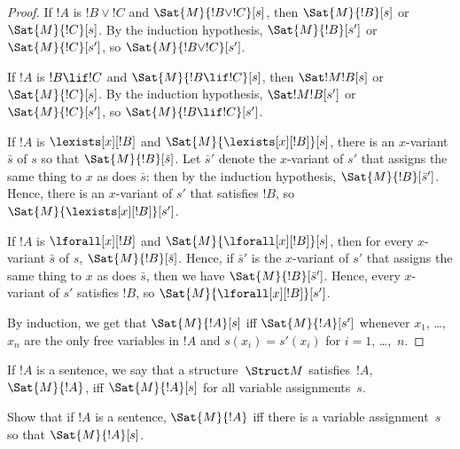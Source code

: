 \documentclass[../../include/open-logic-section]{subfiles}
\begin{document}
\begin{proof}
If $!A$ is $!B \lor !C$ and $\Sat{M}{!B \lor !C}[s]$, then
$\Sat{M}{!B}[s]$ or $\Sat{M}{!C}[s]$. By the induction hypothesis,
$\Sat{M}{!B}[s']$ or $\Sat{M}{!C}[s']$, so $\Sat{M}{!B \lor !C}[s']$.

If $!A$ is $!B \lif !C$ and $\Sat{M}{!B \lif !C}[s]$, then
$\Sat!{M}{!B}[s]$ or $\Sat{M}{!C}[s]$. By the induction hypothesis,
$\Sat!{M}{!B}[s']$ or $\Sat{M}{!C}[s']$, so $\Sat{M}{!B \lif !C}[s']$.

If $!A$ is $\lexists[x][!B]$ and $\Sat{M}{\lexists[x][!B]}[s]$, there
is an $x$-variant $\bar{s}$ of $s$ so that $\Sat{M}{!B}[\bar{s}]$. Let
$\bar{s}'$ denote the $x$-variant of $s'$ that assigns the same thing
to $x$ as does $\bar{s}$: then by the induction hypothesis,
$\Sat{M}{!B}[\bar{s}']$. Hence, there is an $x$-variant of $s'$ that
satisfies $!B$, so $\Sat{M}{\lexists[x][!B]}[s']$.

If $!A$ is $\lforall[x][!B]$ and $\Sat{M}{\lforall[x][!B]}[s]$, then
for every $x$-variant $\bar{s}$ of $s$, $\Sat{M}{!B}[\bar{s}]$. Hence,
if $\bar{s}'$ is the $x$-variant of $s'$ that assigns the same thing
to $x$ as does $\bar{s}$, then we have $\Sat{M}{!B}[\bar{s}']$. Hence,
every $x$-variant of $s'$ satisfies $!B$, so
$\Sat{M}{\lforall[x][!B]}[s']$.

By induction, we get that $\Sat{M}{!A}[s]$ iff $\Sat{M}{!A}[s']$
whenever $x_1$, \dots, $x_n$ are the only free variables in $!A$ and
$s(x_i)=s'(x_i)$ for $i=1$, \dots,~$n$.
\end{proof}
 
\begin{defn}
If $!A$ is a sentence, we say that a structure~$\Struct M$
satisfies~$!A$, $\Sat{M}{!A}$, iff $\Sat{M}{!A}[s]$ for all variable
assignments~$s$.
\end{defn}

\begin{prob}
Show that if $!A$ is a sentence, $\Sat{M}{!A}$ iff there is a variable
assignment~$s$ so that $\Sat{M}{!A}[s]$.
\end{prob}
\end{document}
